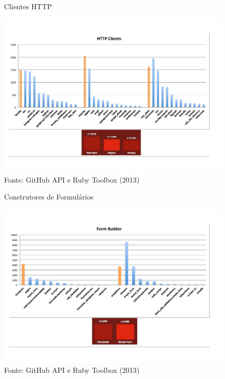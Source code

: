\begin{figure}[ht]
	\centering
    \caption{Clientes HTTP}
    \includegraphics[width=15cm]{Imagens/gems-3.jpg}
	\caption*{Fonte: GitHub API e Ruby Toolbox (2013)}
\end{figure}
\begin{figure}[ht]
	\centering
    \caption{Construtores de Formulários}
    \includegraphics[width=15cm]{Imagens/gems-4.jpg}
	\caption*{Fonte: GitHub API e Ruby Toolbox (2013)}
\end{figure}
